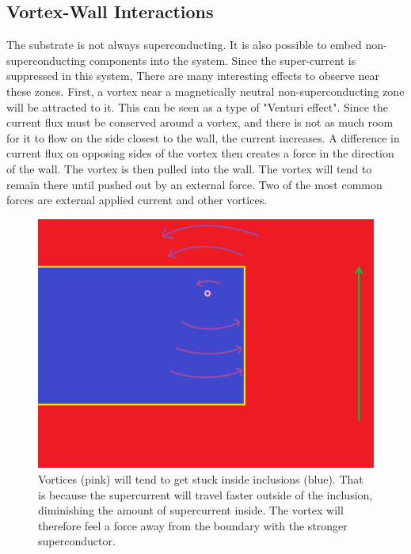 \subsection{Vortex-Wall Interactions}
The substrate is not always superconducting. It is also possible to embed non-superconducting components into the system. Since the super-current is suppressed in this system, There are many interesting effects to observe near these zones. First, a vortex near a magnetically neutral non-superconducting zone will be attracted to it. This can be seen as a type of "Venturi effect". Since the current flux must be conserved around a vortex, and there is not as much room for it to flow on the side closest to the wall, the current increases. A difference in current flux on opposing sides of the vortex then creates a force in the direction of the wall. The vortex is then pulled into the wall. The vortex will tend to remain there until pushed out by an external force. Two of the most common forces are external applied current and other vortices.

\begin{figure}[htbp]
\begin{center}
\includegraphics[scale=.50]{geometryInside.png}
\caption{Vortices (pink) will tend to get stuck inside inclusions (blue). That is because the supercurrent will travel faster outside of the inclusion, diminishing the amount of supercurrent inside. The vortex will therefore feel a force away from the boundary with the stronger superconductor.}
\label{geometryInside}
\end{center}
\end{figure}


